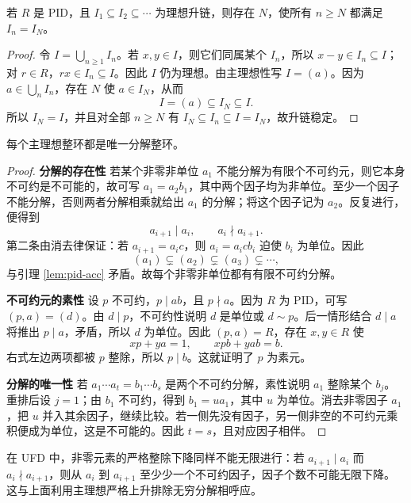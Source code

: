 \documentclass[lang=cn,a4paper,fontset=none,zihao=false,10pt,openany,twoside]{beautybook}
\numberwithin{algorithm}{chapter}
\begin{document}
\begin{lemma}\label{lem:pid-acc}
若 $R$ 是 PID，且 $I_1\subseteq I_2\subseteq\cdots$ 为理想升链，则存在 $N$，使所有 $n\ge N$ 都满足 $I_n=I_N$。
\end{lemma}
\begin{proof}
令 $I=\bigcup_{n\ge1}I_n$。若 $x,y\in I$，则它们同属某个 $I_n$，所以 $x-y\in I_n\subseteq I$；对 $r\in R$，$rx\in I_n\subseteq I$。因此 $I$ 仍为理想。由主理想性写 $I=(a)$。因为 $a\in\bigcup_n I_n$，存在 $N$ 使 $a\in I_N$，从而
\[
 I=(a)\subseteq I_N\subseteq I.
\]
所以 $I_N=I$，并且对全部 $n\ge N$ 有 $I_N\subseteq I_n\subseteq I=I_N$，故升链稳定。
\end{proof}

\begin{theorem}\label{thm:pid-ufd}
每个主理想整环都是唯一分解整环。
\end{theorem}
\begin{proof}
\par\smallskip\noindent\textbf{分解的存在性}\quad
若某个非零非单位 $a_1$ 不能分解为有限个不可约元，则它本身不可约是不可能的，故可写 $a_1=a_2b_1$，其中两个因子均为非单位。至少一个因子不能分解，否则两者分解相乘就给出 $a_1$ 的分解；将这个因子记为 $a_2$。反复进行，便得到
\[
 a_{i+1}\mid a_i,\qquad a_i\nmid a_{i+1}.
\]
第二条由消去律保证：若 $a_{i+1}=a_ic$，则 $a_i=a_icb_i$ 迫使 $b_i$ 为单位。因此
\[
 (a_1)\subsetneq(a_2)\subsetneq(a_3)\subsetneq\cdots,
\]
与引理 \ref{lem:pid-acc} 矛盾。故每个非零非单位都有有限不可约分解。

\par\smallskip\noindent\textbf{不可约元的素性}\quad
设 $p$ 不可约，$p\mid ab$，且 $p\nmid a$。因为 $R$ 为 PID，可写 $(p,a)=(d)$。由 $d\mid p$，不可约性说明 $d$ 是单位或 $d\sim p$。后一情形结合 $d\mid a$ 将推出 $p\mid a$，矛盾，所以 $d$ 为单位。因此 $(p,a)=R$，存在 $x,y\in R$ 使
\[
 xp+ya=1,\qquad xpb+yab=b.
\]
右式左边两项都被 $p$ 整除，所以 $p\mid b$。这就证明了 $p$ 为素元。

\par\smallskip\noindent\textbf{分解的唯一性}\quad
若 $a_1\cdots a_t=b_1\cdots b_s$ 是两个不可约分解，素性说明 $a_1$ 整除某个 $b_j$。重排后设 $j=1$；由 $b_1$ 不可约，得到 $b_1=u a_1$，其中 $u$ 为单位。消去非零因子 $a_1$，把 $u$ 并入其余因子，继续比较。若一侧先没有因子，另一侧非空的不可约元乘积便成为单位，这是不可能的。因此 $t=s$，且对应因子相伴。
\end{proof}
在 UFD 中，非零元素的严格整除下降同样不能无限进行：若 $a_{i+1}\mid a_i$ 而 $a_i\nmid a_{i+1}$，则从 $a_i$ 到 $a_{i+1}$ 至少少一个不可约因子，因子个数不可能无限下降。这与上面利用主理想严格上升排除无穷分解相呼应。
\end{document}
